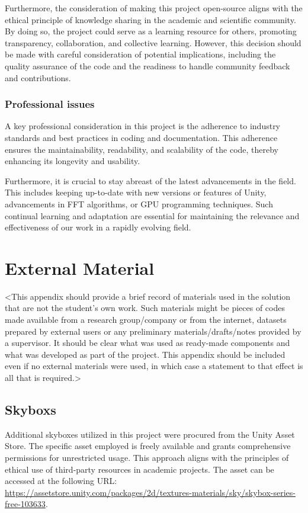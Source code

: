 \begin{appendices}
Furthermore, the consideration of making this project open-source aligns with the ethical principle of knowledge sharing in the academic and scientific community. By doing so, the project could serve as a learning resource for others, promoting transparency, collaboration, and collective learning. However, this decision should be made with careful consideration of potential implications, including the quality assurance of the code and the readiness to handle community feedback and contributions.

\subsection{Professional issues}
A key professional consideration in this project is the adherence to industry standards and best practices in coding and documentation. This adherence ensures the maintainability, readability, and scalability of the code, thereby enhancing its longevity and usability.

Furthermore, it is crucial to stay abreast of the latest advancements in the field. This includes keeping up-to-date with new versions or features of Unity, advancements in FFT algorithms, or GPU programming techniques. Such continual learning and adaptation are essential for maintaining the relevance and effectiveness of our work in a rapidly evolving field.
%
%
\chapter{External Material}
<This appendix should provide a brief record of materials used in the solution that are not the student's own work. Such materials might be pieces of codes made available from a research group/company or from the internet, datasets prepared by external users or any preliminary materials/drafts/notes provided by a supervisor. It should be clear what was used as ready-made components and what was developed as part of the project. This appendix should be included even if no external materials were used, in which case a statement to that effect is all that is required.>
\section{Skyboxs}
Additional skyboxes utilized in this project were procured from the Unity Asset Store. The specific asset employed is freely available and grants comprehensive permissions for unrestricted usage. This approach aligns with the principles of ethical use of third-party resources in academic projects. The asset can be accessed at the following URL: \url{https://assetstore.unity.com/packages/2d/textures-materials/sky/skybox-series-free-103633}.



\end{appendices}
